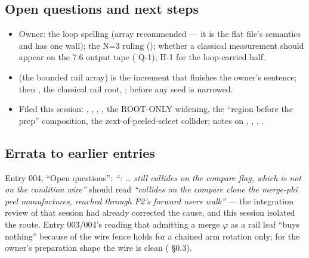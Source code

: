 \subsection*{Open questions and next steps}
\begin{itemize}
  \item Owner: the loop spelling (array recommended --- it is the flat file's semantics and has one wall);
    the N=3 ruling (); whether a classical measurement should appear on the 7.6 output tape
    ( Q-1);  H-1 for the loop-carried half.
  \item {} (the bounded rail array) is the increment that finishes the owner's sentence; then
    , the classical rail root, ;  before any seed is narrowed.
  \item Filed this session: , , , , the ROOT-ONLY widening, the
    ``region before the prep'' composition, the zext-of-peeled-select collider; notes on ,
    , , .
\end{itemize}

\subsection*{Errata to earlier entries}
Entry 004, ``Open questions'': \emph{``: \ldots{} still collides on the compare flag, which is not
on the condition wire''} should read \emph{``collides on the compare \emph{clone} the merge-phi peel
manufactures, reached through F2's forward users walk''} --- the integration review of that session had
already corrected the cause, and this session isolated the route. Entry 003/004's reading that admitting a
merge \(\varphi\) as a rail leaf ``buys nothing'' because of the wire fence holds for a chained arm
rotation only; for the owner's preparation shape the wire is clean ( §0.3).
